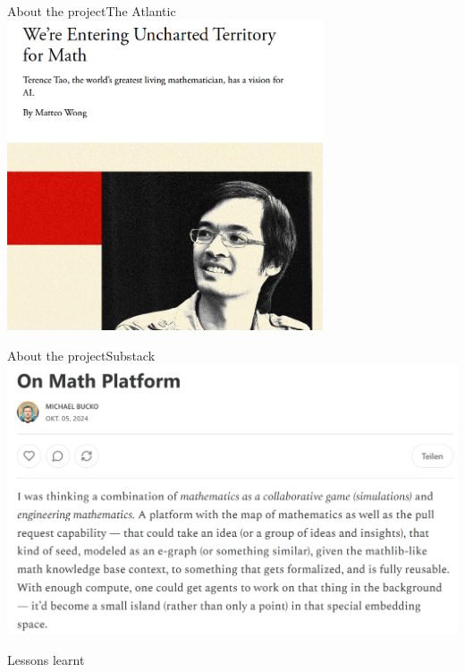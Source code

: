 \documentclass{beamer}
\begin{document}
\begin{frame}{About the project}{The Atlantic}
\includegraphics[width=0.7\textwidth]{atlantic}
\end{frame}


\begin{frame}{About the project}{Substack}
\includegraphics[width=\textwidth]{substack}
\end{frame}


\begin{frame}{Lessons learnt}
\end{frame}
\end{document}
